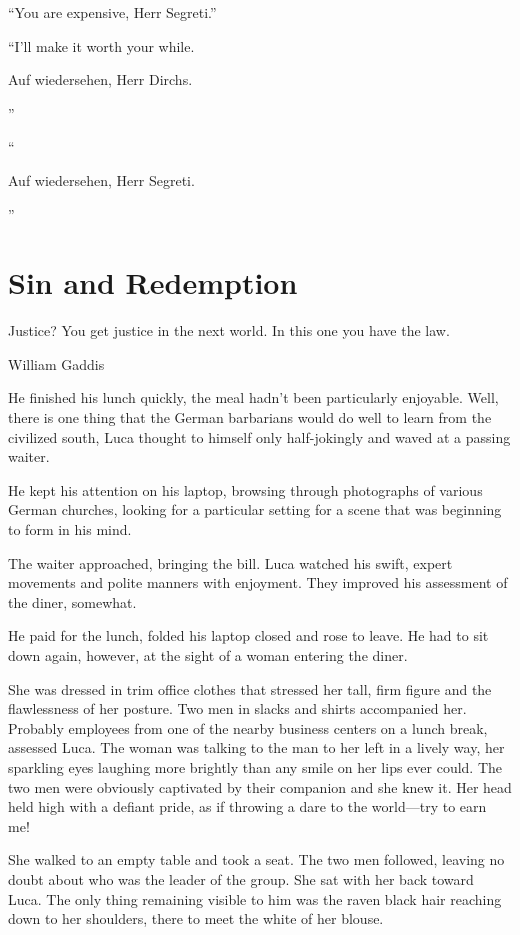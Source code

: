 ``You are expensive, Herr Segreti.''

``I'll make it worth your while. \begin{otherlanguage}{ngerman}Auf wiedersehen, Herr Dirchs.\end{otherlanguage}''

``\begin{otherlanguage}{ngerman}Auf wiedersehen, Herr Segreti.\end{otherlanguage}''

\chapter{Sin and Redemption}

\epigraph{Justice? You get justice in the next world. In this one you have the law.}{William Gaddis}

\firstparagraph

He finished his lunch quickly, the meal hadn't been particularly enjoyable. Well, there is one thing that the German barbarians would do well to learn from the civilized south, Luca thought to himself only half-jokingly and waved at a passing waiter.

He kept his attention on his laptop, browsing through photographs of various German churches, looking for a particular setting for a scene that was beginning to form in his mind.

The waiter approached, bringing the bill. Luca watched his swift, expert movements and polite manners with enjoyment. They improved his assessment of the diner, somewhat.

He paid for the lunch, folded his laptop closed and rose to leave. He had to sit down again, however, at the sight of a woman entering the diner.

She was dressed in trim office clothes that stressed her tall, firm figure and the flawlessness of her posture. Two men in slacks and shirts accompanied her. Probably employees from one of the nearby business centers on a lunch break, assessed Luca. The woman was talking to the man to her left in a lively way, her sparkling eyes laughing more brightly than any smile on her lips ever could. The two men were obviously captivated by their companion and she knew it. Her head held high with a defiant pride, as if throwing a dare to the world---try to earn me!

She walked to an empty table and took a seat. The two men followed, leaving no doubt about who was the leader of the group. She sat with her back toward Luca. The only thing remaining visible to him was the raven black hair reaching down to her shoulders, there to meet the white of her blouse.

